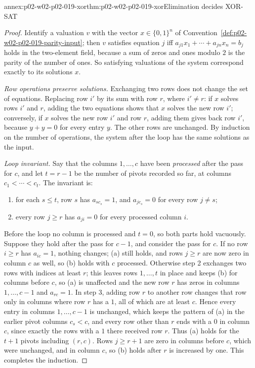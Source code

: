 \begin{annexitem}{annex:p02-w02-p02-019-xor}{thm:p02-w02-p02-019-xor}{Elimination decides XOR-SAT}
\begin{proof}
Identify a valuation \(v\) with the vector \(x\in\{0,1\}^n\) of
Convention~\ref{def:p02-w02-p02-019-parity-input}; then \(v\) satisfies
equation \(j\) iff \(a_{j1}x_1+\cdots+a_{jn}x_n=b_j\) holds in the
two-element field, because a sum of zeros and ones modulo \(2\) is the parity
of the number of ones.  So satisfying valuations of the system correspond
exactly to its solutions \(x\).

\emph{Row operations preserve solutions.}  Exchanging two rows does not change
the set of equations.  Replacing row \(i'\) by its sum with row \(r\), where
\(i'\neq r\): if \(x\) solves rows \(i'\) and \(r\), adding the two equations
shows that \(x\) solves the new row \(i'\); conversely, if \(x\) solves the
new row \(i'\) and row \(r\), adding them gives back row \(i'\), because
\(y+y=0\) for every entry \(y\).  The other rows are unchanged.  By induction
on the number of operations, the system after the loop has the same solutions
as the input.

\emph{Loop invariant.}  Say that the columns \(1,\ldots,c\) have been
\emph{processed} after the pass for \(c\), and let \(t=r-1\) be the number of
pivots recorded so far, at columns \(c_1<\cdots<c_t\).  The invariant is:
\begin{enumerate}
  \item[(a)] for each \(s\leq t\), row \(s\) has \(a_{sc_s}=1\), and
        \(a_{jc_s}=0\) for every row \(j\neq s\);
  \item[(b)] every row \(j\geq r\) has \(a_{ji}=0\) for every processed
        column \(i\).
\end{enumerate}
Before the loop no column is processed and \(t=0\), so both parts hold
vacuously.  Suppose they hold after the pass for \(c-1\), and consider the
pass for \(c\).  If no row \(i\geq r\) has \(a_{ic}=1\), nothing changes;
(a) still holds, and rows \(j\geq r\) are now zero in column \(c\) as well,
so (b) holds with \(c\) processed.  Otherwise step 2 exchanges two rows with
indices at least \(r\); this leaves rows \(1,\ldots,t\) in place and keeps
(b) for columns before \(c\), so (a) is unaffected and the new row \(r\) has
zeros in columns \(1,\ldots,c-1\) and \(a_{rc}=1\).  In step 3, adding row
\(r\) to another row changes that row only in columns where row \(r\) has a
\(1\), all of which are at least \(c\).  Hence every entry in columns
\(1,\ldots,c-1\) is unchanged, which keeps the pattern of (a) in the earlier
pivot columns \(c_s<c\), and every row other than \(r\) ends with a \(0\) in
column \(c\), since exactly the rows with a \(1\) there received row \(r\).
Thus (a) holds for the \(t+1\) pivots including \((r,c)\).  Rows \(j\geq r+1\)
are zero in columns before \(c\), which were unchanged, and in column \(c\),
so (b) holds after \(r\) is increased by one.  This completes the induction.


\end{proof}
\end{annexitem}
